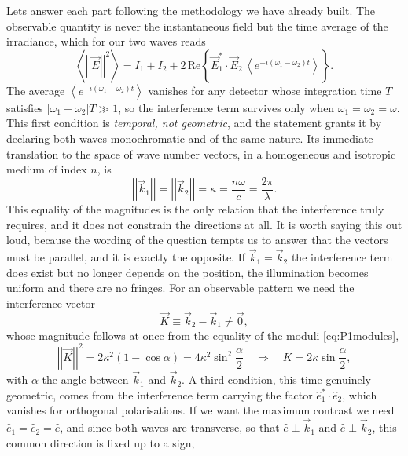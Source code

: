         Lets answer each part following the methodology we have already built. The observable quantity is never the instantaneous field but the time average of the irradiance, which for our two waves reads
        \begin{equation}
            \left\langle \left|\left|\vec{E}\right|\right|^2 \right\rangle = I_1 + I_2 + 2\,\text{Re}\left\{ \vec{E}_1^*\cdot\vec{E}_2\, \left\langle e^{-i(\omega_1-\omega_2)t} \right\rangle \right\}.
        \end{equation}
        The average $\left\langle e^{-i(\omega_1-\omega_2)t} \right\rangle$ vanishes for any detector whose integration time $T$ satisfies $|\omega_1-\omega_2|T \gg 1$, so the interference term survives only when $\omega_1 = \omega_2 = \omega$. This first condition is \emph{temporal, not geometric}, and the statement grants it by declaring both waves monochromatic and of the same nature. Its immediate translation to the space of wave number vectors, in a homogeneous and isotropic medium of index $n$, is
        \begin{equation}\label{eq:P1modules}
            \left|\left|\vec{k}_1\right|\right| = \left|\left|\vec{k}_2\right|\right| = \kappa = \frac{n\omega}{c} = \frac{2\pi}{\lambda}.
        \end{equation}
        This equality of the magnitudes is the only relation that the interference truly requires, and it does not constrain the directions at all. It is worth saying this out loud, because the wording of the question tempts us to answer that the vectors must be parallel, and it is exactly the opposite. If $\vec{k}_1 = \vec{k}_2$ the interference term does exist but no longer depends on the position, the illumination becomes uniform and there are no fringes. For an observable pattern we need the interference vector
        \begin{equation}
            \vec{K} \equiv \vec{k}_2 - \vec{k}_1 \neq \vec{0},
        \end{equation}
        whose magnitude follows at once from the equality of the moduli \ref{eq:P1modules},
        \begin{equation}
            \left|\left|\vec{K}\right|\right|^2 = 2\kappa^2(1-\cos\alpha) = 4\kappa^2\sin^2\frac{\alpha}{2} \quad\Longrightarrow\quad K = 2\kappa\sin\frac{\alpha}{2},
        \end{equation}
        with $\alpha$ the angle between $\vec{k}_1$ and $\vec{k}_2$. A third condition, this time genuinely geometric, comes from the interference term carrying the factor $\hat{e}_1^*\cdot\hat{e}_2$, which vanishes for orthogonal polarisations. If we want the maximum contrast we need $\hat{e}_1 = \hat{e}_2 = \hat{e}$, and since both waves are transverse, so that $\hat{e}\perp\vec{k}_1$ and $\hat{e}\perp\vec{k}_2$, this common direction is fixed up to a sign,
